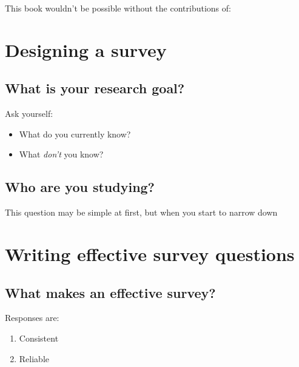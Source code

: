 \documentclass[]{book}
\providecommand{\tightlist}{%
  \setlength{\itemsep}{0pt}\setlength{\parskip}{0pt}}
\begin{document}
This book wouldn't be possible without the contributions of:

\hypertarget{macro}{%
\chapter{Designing a survey}\label{macro}}

\hypertarget{what-is-your-research-goal}{%
\section{What is your research goal?}\label{what-is-your-research-goal}}

Ask yourself:

\begin{itemize}
\tightlist
\item
  What do you currently know?
\item
  What \emph{don't} you know?
\end{itemize}

\hypertarget{who-are-you-studying}{%
\section{Who are you studying?}\label{who-are-you-studying}}

This question may be simple at first, but when you start to narrow down

\hypertarget{writing-effective-survey-questions}{%
\chapter{Writing effective survey questions}\label{writing-effective-survey-questions}}

\hypertarget{what-makes-an-effective-survey}{%
\section*{What makes an effective survey?}\label{what-makes-an-effective-survey}}

Responses are:

\begin{enumerate}
\def\labelenumi{\arabic{enumi}.}
\tightlist
\item
  Consistent\\
\item
  Reliable
\end{enumerate}
\end{document}
